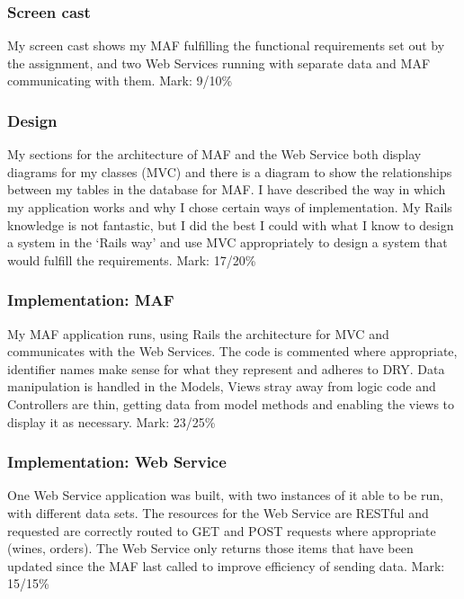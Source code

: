 \documentclass[12pt]{article}
\begin{document}
\subsubsection{Screen cast}
My screen cast shows my MAF fulfilling the functional requirements set out by the assignment, and two Web Services running with separate data and MAF communicating with them.
\newline
Mark: 9/10\%

\subsubsection{Design}
My sections for the architecture of MAF and the Web Service both display diagrams for my classes (MVC) and there is a diagram to show the relationships between my tables in the database for MAF. I have described the way in which my application works and why I chose certain ways of implementation. My Rails knowledge is not fantastic, but I did the best I could with what I know to design a system in the `Rails way' and use MVC appropriately to design a system that would fulfill the requirements.
\newline
Mark: 17/20\%

\subsubsection{Implementation: MAF}
My MAF application runs, using Rails the architecture for MVC and communicates with the Web Services. The code is commented where appropriate, identifier names make sense for what they represent and adheres to DRY. Data manipulation is handled in the Models, Views stray away from logic code and Controllers are thin, getting data from model methods and enabling the views to display it as necessary.
\newline
Mark: 23/25\%

\subsubsection{Implementation: Web Service}
One Web Service application was built, with two instances of it able to be run, with different data sets. The resources for the Web Service are RESTful and requested are correctly routed to GET and POST requests where appropriate (wines, orders). The Web Service only returns those items that have been updated since the MAF last called to improve efficiency of sending data.
\newline
Mark: 15/15\%
\end{document}
